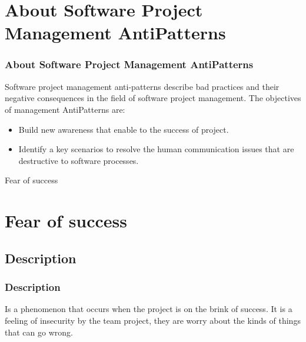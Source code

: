 \documentclass{beamer}
\begin{document}
\section{About Software Project Management AntiPatterns}
\begin{frame}
\frametitle{About Software Project Management AntiPatterns}
Software project management anti-patterns describe bad practices and their negative consequences in the field of software project management. The objectives of management AntiPatterns are:\\
\begin{itemize}
\item Build new awareness that enable to the success of project.
\item Identify a key scenarios to resolve the  human communication issues that are destructive to software processes.
\end{itemize}
\end{frame}

\begin{center}
\begin{frame}
Fear of success
\end{frame}
\end{center}
\section{Fear of success}
\subsection{Description}
\begin{frame}
\frametitle{Description}
Is a phenomenon that occurs when the project is on the brink of success. It is a feeling of insecurity by the team project, they are worry about the kinds of things that can go wrong.
\end{frame}
\end{document}
